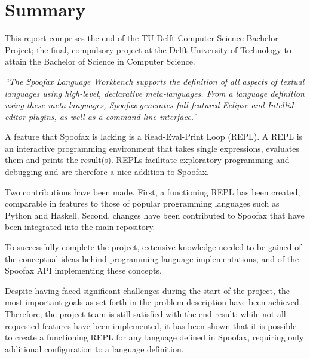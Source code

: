 \chapter{Summary}
\label{cha:summary}

This report comprises the end of the TU Delft Computer Science Bachelor Project;
the final, compulsory project at the Delft University of Technology to attain
the Bachelor of Science in Computer Science.

\textit{``The Spoofax Language Workbench supports the definition of all aspects
of textual languages using high-level, declarative meta-languages. From a
language definition using these meta-languages, Spoofax generates full-featured
Eclipse and IntelliJ editor plugins, as well as a command-line interface.''}

A feature that Spoofax is lacking is a Read-Eval-Print Loop (REPL). A
REPL is an interactive programming environment that takes single expressions,
evaluates them and prints the result(s). REPLs facilitate exploratory
programming and debugging and are therefore a nice addition to Spoofax.

Two contributions have been made. First, a functioning REPL has been created,
comparable in features to those of popular programming languages such as Python
and Haskell. Second, changes have been contributed to Spoofax that have been
integrated into the main repository.

To successfully complete the project, extensive knowledge needed to be gained of
the conceptual ideas behind programming language implementations, and of the
Spoofax API implementing these concepts.

Despite having faced significant challenges during the start of the project, the
most important goals as set forth in the problem description have been achieved.
Therefore, the project team is still satisfied with the end result: while
not all requested features have been implemented, it has been shown that it is
possible to create a functioning REPL for any language defined in Spoofax,
requiring only additional configuration to a language definition.


